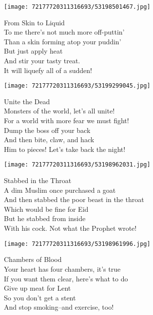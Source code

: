 \documentclass[10pt,letterpaper]{article}
\begin{document}
\begin{center}\texttt{[image: 72177720311316693/53198501467.jpg]}
\end{center}
\begin{center}
From Skin to Liquid\\
\vskip 0.2in
To me there's not much more off-puttin'\\
Than a skin forming atop your puddin'\\
But just apply heat\\
And stir your tasty treat.\\
It will liquefy all of a sudden!\\
\end{center}
\pagebreak

\begin{center}\texttt{[image: 72177720311316693/53199299045.jpg]}
\end{center}
\begin{center}
Unite the Dead\\
\vskip 0.2in
Monsters of the world, let's all unite!\\
For a world with more fear we must fight!\\
Dump the boss off your back\\
And then bite, claw, and hack\\
Him to pieces!  Let's take back the night!\\
\end{center}
\pagebreak

\begin{center}\texttt{[image: 72177720311316693/53198962031.jpg]}
\end{center}
\begin{center}
Stabbed in the Throat\\
\vskip 0.2in
A dim Muslim once purchased a goat\\
And then stabbed the poor beast in the throat\\
Which would be fine for Eid\\
But he stabbed from inside\\
With his cock.  Not what the Prophet wrote!\\
\end{center}
\pagebreak

\begin{center}\texttt{[image: 72177720311316693/53198961996.jpg]}
\end{center}
\begin{center}
Chambers of Blood\\
\vskip 0.2in
Your heart has four chambers, it's true\\
If you want them clear, here's what to do\\
Give up meat for Lent\\
So you don't get a stent\\
And stop smoking--and exercise, too!\\
\end{center}
\pagebreak
\end{document}
